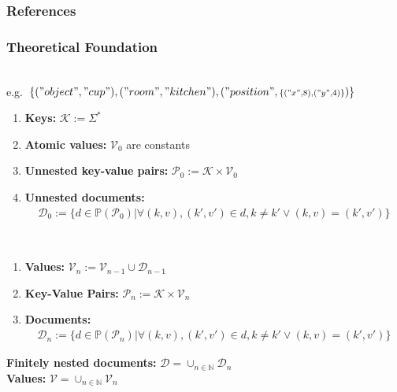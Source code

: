 
\setcounter{finalframe}{\value{framenumber}}


\begin{frame}[allowframebreaks]
  \frametitle{References}
  \small
  
  
\end{frame}


\begin{frame}
  \frametitle{Theoretical Foundation}
\begin{description}[]
  \item[Definition of documents representing knowledge] \hfill \\
  \small e.g.~$\{("object","cup"),("room","kitchen"),("position",{\scriptstyle\{("x",8),("y",4)\}})\}$
  \begin{enumerate}
\item \textbf{Keys:} $\mathcal{K} := \Sigma^*$
\item  \textbf{Atomic values:} $\mathcal{V}_0$ are constants
\item \textbf{Unnested key-value pairs:} $\mathcal{P}_0:=\mathcal{K}\times\mathcal{V}_0$
\item \textbf{Unnested documents:} \vspace{-0.3cm}
\begin{align*}
\mathcal{D}_0:=\{
  d\in\mathbb{P}(\mathcal{P}_0)|
  \forall (k,v),(k',v')\in d , k\neq k' \vee (k,v)=(k',v')
  \}
\end{align*}
\end{enumerate}
  \item[With nesting] \hfill \\
  \begin{enumerate}
\item  \textbf{Values:} $\mathcal{V}_n := \mathcal{V}_{n-1} \cup \mathcal{D}_{n-1}$
\item \textbf{Key-Value Pairs:} $\mathcal{P}_n:=\mathcal{K}\times\mathcal{V}_n$
\item \textbf{Documents:} \vspace{-0.3cm}
\begin{align*}
  \mathcal{D}_n:=\{
  d\in\mathbb{P}(\mathcal{P}_n)|
  \forall (k,v),(k',v')\in d , k\neq k' \vee (k,v)=(k',v')
  \}
\end{align*}
\end{enumerate}
  \end{description}
  \textbf{Finitely nested documents:} $\mathcal{D}=\cup_{n\in\mathbb{N}}\mathcal{D}_n$\\
  \textbf{Values:} $\mathcal{V}=\cup_{n\in\mathbb{N}}\mathcal{V}_n$
\end{frame}

